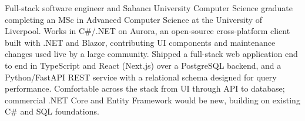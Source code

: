 
\newcommand{\cvprojects}{onepage_projects_backend}



Full-stack software engineer and Sabancı University Computer Science graduate completing an MSc in Advanced Computer Science at the University of Liverpool. Works in C\#/.NET on Aurora, an open-source cross-platform client built with .NET and Blazor, contributing UI components and maintenance changes used live by a large community. Shipped a full-stack web application end to end in TypeScript and React (Next.js) over a PostgreSQL backend, and a Python/FastAPI REST service with a relational schema designed for query performance. Comfortable across the stack from UI through API to database; commercial .NET Core and Entity Framework would be new, building on existing C\# and SQL foundations.




